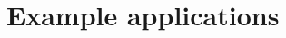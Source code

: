 \documentclass[a4paper,12pt]{scrartcl}
\begin{document}












%







\section{Example applications}
\end{document}
